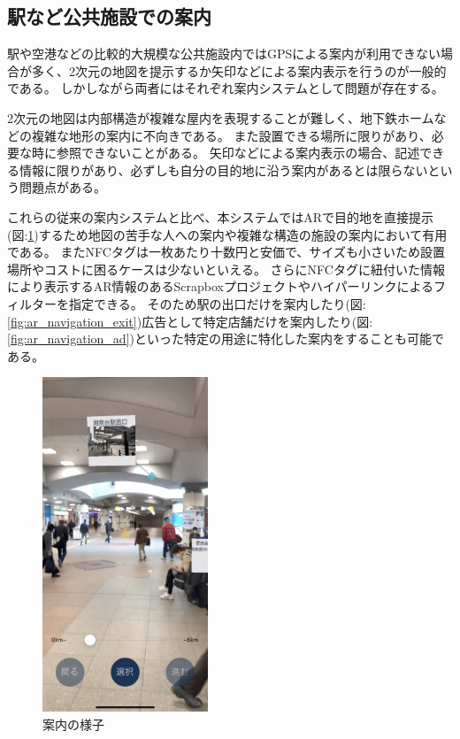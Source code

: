 \subsection{駅など公共施設での案内}
駅や空港などの比較的大規模な公共施設内ではGPSによる案内が利用できない場合が多く、2次元の地図を提示するか矢印などによる案内表示を行うのが一般的である。
しかしながら両者にはそれぞれ案内システムとして問題が存在する。

2次元の地図は内部構造が複雑な屋内を表現することが難しく、地下鉄ホームなどの複雑な地形の案内に不向きである。
また設置できる場所に限りがあり、必要な時に参照できないことがある。
矢印などによる案内表示の場合、記述できる情報に限りがあり、必ずしも自分の目的地に沿う案内があるとは限らないという問題点がある。

これらの従来の案内システムと比べ、本システムではARで目的地を直接提示(図:\ref{fig:ar_navigation_shonandai})するため地図の苦手な人への案内や複雑な構造の施設の案内において有用である。
またNFCタグは一枚あたり十数円と安価で、サイズも小さいため設置場所やコストに困るケースは少ないといえる。
さらにNFCタグに紐付いた情報により表示するAR情報のあるScrapboxプロジェクトやハイパーリンクによるフィルターを指定できる。
そのため駅の出口だけを案内したり(図:\ref{fig:ar_navigation_exit})広告として特定店舗だけを案内したり(図:\ref{fig:ar_navigation_ad})といった特定の用途に特化した案内をすることも可能である。

\begin{figure}[H]
  \centering
  \includegraphics[height=100mm]{images/ar_navigation_shonandai.jpg}
  \caption{案内の様子} \label{fig:ar_navigation_shonandai}
\end{figure}

